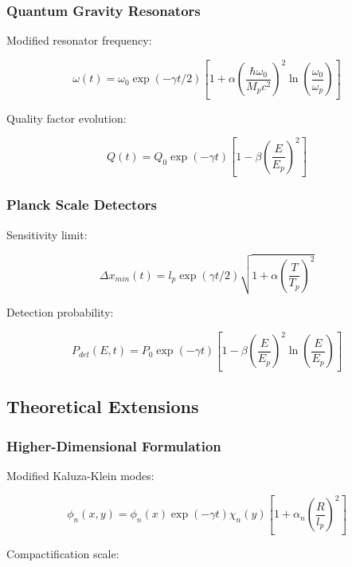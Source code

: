 \documentclass[12pt]{article}
\theoremstyle{plain}
\theoremstyle{definition}
\theoremstyle{remark}
\begin{document}
\subsubsection{Quantum Gravity Resonators}

Modified resonator frequency:

\begin{equation}
\omega(t) = \omega_0\exp(-\gamma t/2)\left[1 + \alpha\left(\frac{\hbar\omega_0}{M_pc^2}\right)^2\ln\left(\frac{\omega_0}{\omega_p}\right)\right]
\end{equation}

Quality factor evolution:

\begin{equation}
Q(t) = Q_0\exp(-\gamma t)\left[1 - \beta\left(\frac{E}{E_p}\right)^2\right]
\end{equation}

\subsubsection{Planck Scale Detectors}

Sensitivity limit:

\begin{equation}
\Delta x_{min}(t) = l_p\exp(\gamma t/2)\sqrt{1 + \alpha\left(\frac{T}{T_p}\right)^2}
\end{equation}

Detection probability:

\begin{equation}
P_{det}(E,t) = P_0\exp(-\gamma t)\left[1 - \beta\left(\frac{E}{E_p}\right)^2\ln\left(\frac{E}{E_p}\right)\right]
\end{equation}

\subsection{Theoretical Extensions}

\subsubsection{Higher-Dimensional Formulation}

Modified Kaluza-Klein modes:

\begin{equation}
\phi_n(x,y) = \phi_n(x)\exp(-\gamma t)\chi_n(y)\left[1 + \alpha_n\left(\frac{R}{l_p}\right)^2\right]
\end{equation}

Compactification scale:
\end{document}
